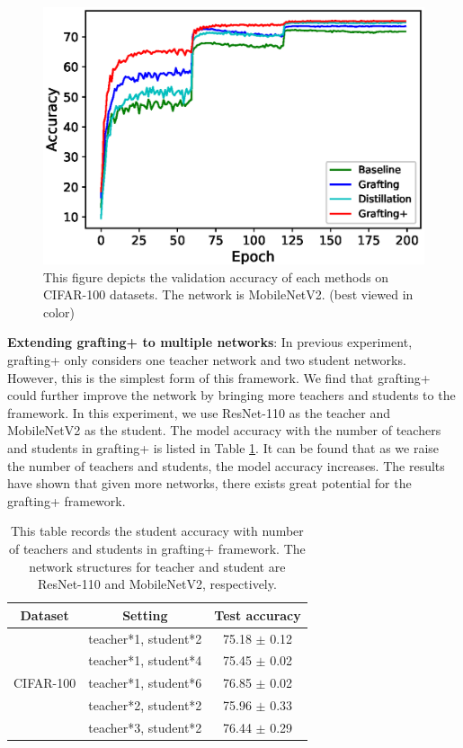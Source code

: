 \documentclass{article}
\begin{document}
\begin{figure}[!h]
	\centering
	\includegraphics[width=15cm,]{fig/acc.eps}
	\caption{This figure depicts the validation accuracy of each methods on CIFAR-100 datasets. The network is MobileNetV2. (best viewed in color)}
	\label{figure: accuracy_curve}
\end{figure}


\textbf{Extending grafting+ to multiple networks}: In previous experiment, grafting+ only considers one teacher network and two student networks. However, this is the simplest form of this framework. We find that grafting+ could further improve the network by bringing more teachers and students to the framework. In this experiment, we use ResNet-110 as the teacher and MobileNetV2 as the student. The model accuracy with the number of teachers and students in grafting+ is listed in Table \ref{table:number_T_S}.  It can be found that as we raise the number of teachers and students, the model accuracy increases. The results have shown that given more networks, there exists great potential for the grafting+ framework.

\begin{table}[!h]
	\caption{This table records the student accuracy with number of teachers and students in grafting+ framework. The network structures for teacher and student are ResNet-110 and MobileNetV2, respectively.}
	\begin{center}
		\begin{tabular}{|c|c|c|} 
			\hline
			Dataset&Setting&Test accuracy\\
			\hline
			\multirow{5}{*}{CIFAR-100}& teacher*1, student*2& 75.18 $\pm$ 0.12 \\
			& teacher*1, student*4& 75.45 $\pm$ 0.02 \\
			& teacher*1, student*6& 76.85 $\pm$ 0.02 \\
			& teacher*2, student*2 & 75.96 $\pm$ 0.33\\
			& teacher*3, student*2 & 76.44 $\pm$ 0.29\\
			\hline
		\end{tabular}
	\end{center}
	\label{table:number_T_S}
\end{table}
\end{document}

